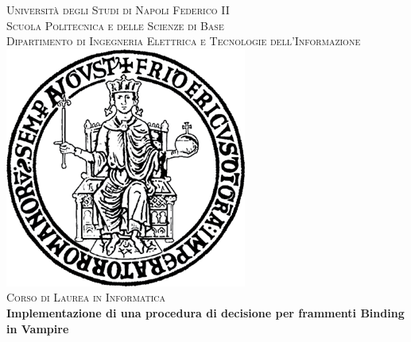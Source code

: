 \documentclass[./main.tex]{subfiles}
\begin{document}

\pagestyle{empty}

\begin{center}

{\fontsize{0.7cm}{1em}\selectfont \textsc{Università degli Studi di Napoli Federico II}}\\[5pt]
{\fontsize{0.6cm}{1em}\selectfont \textsc{Scuola Politecnica e delle Scienze di Base}}\\[5pt]
{\fontsize{0.45cm}{1em}\selectfont \textsc{ Dipartimento di Ingegneria Elettrica e Tecnologie dell'Informazione}}\\[0.5cm]
\vspace{1cm}
\includegraphics[scale=0.7]{images/logo.png}\\[10pt] 
{\fontsize{0.6cm}{1em}\selectfont \textsc{Corso di Laurea in Informatica}}\\[1cm]

{\huge \textbf{Implementazione di una procedura di decisione per frammenti Binding in Vampire}\\[0.5cm]}

\vfill



\end{center}
\end{document}
